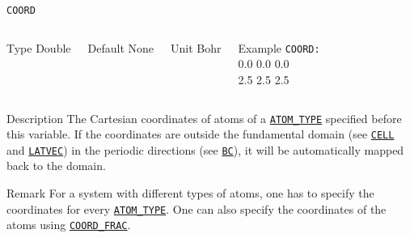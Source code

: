 \documentclass[xcolor=dvipsnames,t]{beamer}
\begin{document}
\begin{frame}[allowframebreaks]{\texttt{COORD}} \label{COORD}
\vspace*{-12pt}
\begin{columns}
\begin{block}{Type}
Double
\end{block}

\begin{block}{Default}
None
\end{block}

\begin{block}{Unit}
Bohr
\end{block}

\begin{block}{Example}
\texttt{COORD: \\}
0.0 0.0 0.0 \\
2.5 2.5 2.5
\end{block}
\end{columns}

\begin{block}{Description}
The Cartesian coordinates of atoms of a \hyperlink{ATOM_TYPE}{\texttt{ATOM\_TYPE}} specified before this variable. If the coordinates are outside the fundamental domain (see \hyperlink{CELL}{\texttt{CELL}} and \hyperlink{LATVEC}{\texttt{LATVEC}}) in the periodic directions (see \hyperlink{BC}{\texttt{BC}}), it will be automatically mapped back to the domain.
\end{block}

\begin{block}{Remark}
For a system with different types of atoms, one has to specify the coordinates for every \hyperlink{ATOM_TYPE}{\texttt{ATOM\_TYPE}}. One can also specify the coordinates of the atoms using \hyperlink{COORD_FRAC}{\texttt{COORD\_FRAC}}.
\end{block}

\end{frame}
\end{document}
